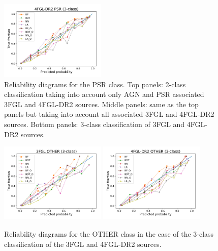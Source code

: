 \documentclass{aa}
\begin{document}
\begin{appendix}
\begin{figure}[h!t]
\includegraphics[width=0.45\textwidth]{plots/reliability/calibration_PSR_4FGL-DR2_3classes.pdf}
\caption{Reliability diagrams for the PSR class. Top panels: 2-class classification 
taking into account only AGN and PSR associated 3FGL and 4FGL-DR2 sources.
Middle panels: same as the top panels but taking into account all associated 3FGL and 4FGL-DR2 sources.
Bottom panels: 3-class classification of 3FGL and 4FGL-DR2 sources.
}
\label{fig:rel_PSR}
\end{figure}


\begin{figure}[ht]
\centering
\hspace*{-0.5cm}
\includegraphics[width=0.45\textwidth]{plots/reliability/calibration_OTHER_3FGL_3classes.pdf}
\includegraphics[width=0.45\textwidth]{plots/reliability/calibration_OTHER_4FGL-DR2_3classes.pdf}
\caption{Reliability diagrams for the OTHER class in the case of the 3-class classification of the 3FGL and 4FGL-DR2 sources.
}
\label{fig:rel_OTHER}
\end{figure}


\end{appendix}
\end{document}
